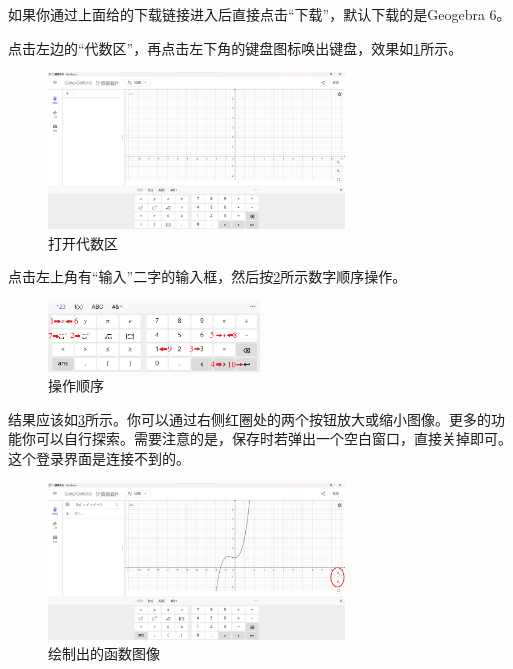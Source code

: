 \documentclass[lang=cn,math=cm,chinesefont=nofont,11pt,scheme=chinese,onecol]{elegantbook}
\begin{document}
\begin{remark}
  如果你通过上面给的下载链接进入后直接点击“下载”，默认下载的是Geogebra 6。
\end{remark}

\hspace*{\fill}

点击左边的“代数区”，再点击左下角的键盘图标唤出键盘，效果如\ref{img:geogebra2}所示。

\begin{figure}[h]
  \centering
  \includegraphics[width=0.7\textwidth]{image/geogebra2.png}
  \caption{打开代数区}
  \label{img:geogebra2}
\end{figure}

点击左上角有“输入”二字的输入框，然后按\ref{img:geogebra3}所示数字顺序操作。

\begin{figure}[h]
  \centering
  \includegraphics[width=0.5\textwidth]{image/geogebra3.png}
  \caption{操作顺序}
  \label{img:geogebra3}
\end{figure}

结果应该如\ref{img:geogebra4}所示。你可以通过右侧红圈处的两个按钮放大或缩小图像。更多的功能你可以自行探索。需要注意的是，保存时若弹出一个空白窗口，直接关掉即可。这个登录界面是连接不到的。

\begin{figure}[h]
  \centering
  \includegraphics[width=0.7\textwidth]{image/geogebra4.png}
  \caption{绘制出的函数图像}
  \label{img:geogebra4}
\end{figure}
\end{document}
